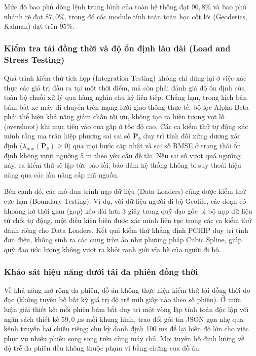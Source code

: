 Mức độ bao phủ dòng lệnh trung bình của toàn hệ thống đạt $90{,}8\%$ và bao phủ nhánh rẽ đạt $87{,}0\%$, trong đó các module tính toán toán học cốt lõi (Geodetics, Kalman) đạt trên $95\%$.

\subsubsection{Kiểm tra tải đồng thời và độ ổn định lâu dài (Load and Stress Testing)}

\hspace{0.5cm} Quá trình kiểm thử tích hợp (Integration Testing) không chỉ dừng lại ở việc xác thực các giá trị đầu ra tại một thời điểm, mà còn phải đánh giá độ ổn định của toàn bộ chuỗi xử lý qua hàng nghìn chu kỳ liên tiếp. Chẳng hạn, trong kịch bản bám bắt xe máy di chuyển trên mạng lưới giao thông thực tế, bộ lọc Alpha-Beta phải thể hiện khả năng giảm chấn tối ưu, không tạo ra hiện tượng vọt lố (overshoot) khi mục tiêu vào cua gấp ở tốc độ cao. Các ca kiểm thử tự động xác minh rằng ma trận hiệp phương sai sai số $\mathbf{P}_k$ duy trì tính đối xứng dương xác định ($\lambda_{\min}(\mathbf{P}_k) \geq 0$) qua mọi bước cập nhật và sai số RMSE ở trạng thái ổn định không vượt ngưỡng 5 m theo yêu cầu đề tài. Nếu sai số vượt quá ngưỡng này, ca kiểm thử sẽ lập tức báo lỗi, bảo đảm hệ thống không bị suy thoái hiệu năng qua các lần nâng cấp mã nguồn.

Bên cạnh đó, các mô-đun trình nạp dữ liệu (Data Loaders) cũng được kiểm thử cực hạn (Boundary Testing). Ví dụ, với dữ liệu người đi bộ Geolife, các đoạn có khoảng hở thời gian (gap) kéo dài hơn 3 giây trong quỹ đạo gốc bị bộ nạp dữ liệu từ chối tự động, một điều kiện biên được xác minh liên tục trong các ca kiểm thử dành riêng cho Data Loaders. Kết quả kiểm thử khẳng định PCHIP duy trì tính đơn điệu, không sinh ra các cung tròn ảo như phương pháp Cubic Spline, giúp quỹ đạo ước lượng không vượt ra khỏi ranh giới vỉa hè của người đi bộ.


\subsubsection{Khảo sát hiệu năng dưới tải đa phiên đồng thời}

\hspace{0.5cm} Về khả năng mở rộng đa phiên, đồ án không thực hiện kiểm thử tải đồng thời đo đạc (không tuyên bố bất kỳ giá trị độ trễ mili giây nào theo số phiên). Ở mức luận giải thiết kế: mỗi phiên bám bắt duy trì một vòng lặp tính toán độc lập với ngân sách thiết kế $59{,}0$ $\mu$s mỗi khung hình, trao đổi gói tin JSON gọn nhẹ qua kênh truyền hai chiều riêng; chu kỳ danh định 100 ms để lại biên độ lớn cho việc phục vụ nhiều phiên song song trên cùng máy chủ. Mọi tuyên bố định lượng về độ trễ đa phiên đều không thuộc phạm vi bằng chứng của đồ án.

